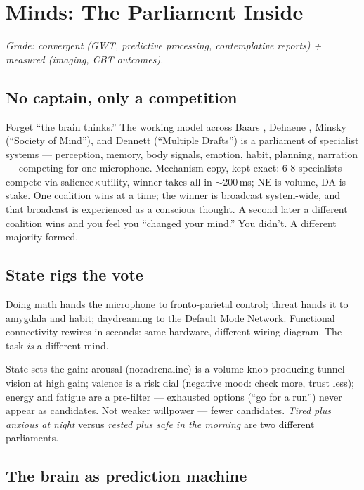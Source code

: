 \documentclass[11pt]{article}
\begin{document}
\section{Minds: The Parliament Inside}
\label{sec:minds}

\textit{Grade: convergent (GWT, predictive processing, contemplative reports) + measured (imaging, CBT outcomes).}

\subsection{No captain, only a competition}

Forget ``the brain thinks.'' The working model across Baars \citep{baars1988}, Dehaene \citep{atallah2026gwt}, Minsky (``Society of Mind''), and Dennett (``Multiple Drafts'') is a parliament of specialist systems --- perception, memory, body signals, emotion, habit, planning, narration --- competing for one microphone. Mechanism copy, kept exact: 6-8 specialists compete via salience$\times$utility, winner-takes-all in $\sim$200\,ms; NE is volume, DA is stake. One coalition wins at a time; the winner is broadcast system-wide, and that broadcast is experienced as a conscious thought. A second later a different coalition wins and you feel you ``changed your mind.'' You didn't. A different majority formed.

\subsection{State rigs the vote}

Doing math hands the microphone to fronto-parietal control; threat hands it to amygdala and habit; daydreaming to the Default Mode Network. Functional connectivity rewires in seconds: same hardware, different wiring diagram. The task \emph{is} a different mind.

State sets the gain: arousal (noradrenaline) is a volume knob producing tunnel vision at high gain; valence is a risk dial (negative mood: check more, trust less); energy and fatigue are a pre-filter --- exhausted options (``go for a run'') never appear as candidates. Not weaker willpower --- fewer candidates. \emph{Tired plus anxious at night} versus \emph{rested plus safe in the morning} are two different parliaments.

\subsection{The brain as prediction machine}
\end{document}

